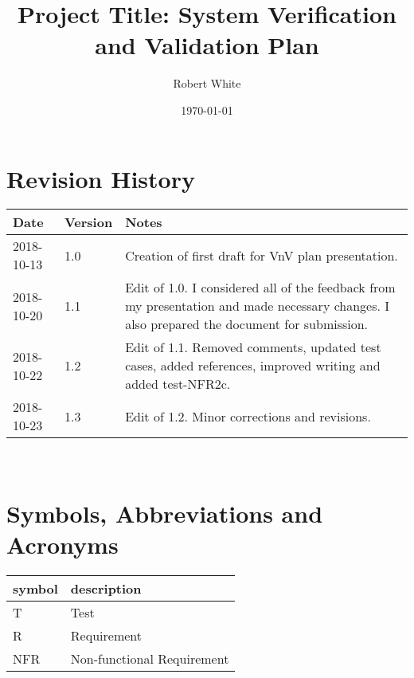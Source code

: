 \documentclass[12pt, titlepage]{article}
\begin{document}
\title{Project Title: System Verification and Validation Plan} 
\author{Robert White}
\date{\today}
	
\maketitle


\section{Revision History}

\begin{tabularx}{\textwidth}{p{3cm}p{2cm}X}
\toprule {\bf Date} & {\bf Version} & {\bf Notes}\\
\midrule
2018-10-13 & 1.0 & Creation of first draft for VnV plan presentation.\\
2018-10-20 & 1.1 & Edit of 1.0. I considered all of the feedback from my 
presentation and made necessary changes. I also prepared the document for 
submission. \\ 
2018-10-22 & 1.2 & Edit of 1.1. Removed comments, updated test cases, added 
references, improved writing and added test-NFR2c. \\ 
2018-10-23 & 1.3 & Edit of 1.2. Minor corrections and revisions. \\
\bottomrule
\end{tabularx}

~\newpage

\section{Symbols, Abbreviations and Acronyms}

\renewcommand{\arraystretch}{1.2}
\begin{tabular}{l l} 
  \toprule		
  \textbf{symbol} & \textbf{description}\\
  \midrule 
  T & Test\\
  R & Requirement\\ 
  NFR & Non-functional Requirement\\ 
  \bottomrule
\end{tabular}\\

\newpage

\tableofcontents

\listoftables

\listoffigures

\newpage
\end{document}
